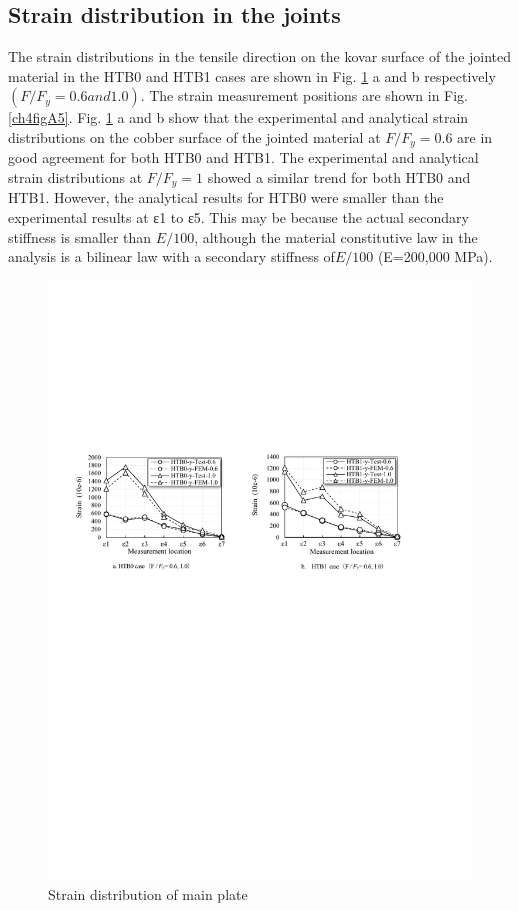 \subsection{Strain distribution in the joints}

The strain distributions in the tensile direction on the kovar surface of the jointed material in the HTB0 and HTB1 cases are shown in Fig. \ref{ch4figA4} a and b respectively $(F / F_y = 0.6 and 1.0)$. The strain measurement positions are shown in Fig. \ref{ch4figA5}.
Fig. \ref{ch4figA4} a and b show that the experimental and analytical strain distributions on the cobber surface of the jointed material at $F / F_y = 0.6$ are in good agreement for both HTB0 and HTB1.
The experimental and analytical strain distributions at $F / F_y = 1$ showed a similar trend for both HTB0 and HTB1. However, the analytical results for HTB0 were smaller than the experimental results at ε1 to ε5. This may be because the actual secondary stiffness is smaller than $E/100$, although the material constitutive law in the analysis is a bilinear law with a secondary stiffness of$ E/100$ (E=200,000 MPa).

\begin{figure}[htbp]
    \centering
    \includegraphics[width=\textwidth]{imgs/ch4/figA4.pdf}
    \caption{Strain distribution of main plate}
    \label{ch4figA4}
\end{figure}

